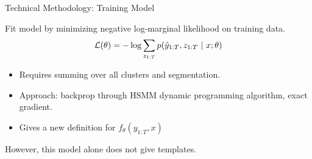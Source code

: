 \begin{frame}{Technical Methodology:  Training Model}


  Fit model by minimizing  negative log-marginal likelihood on training data.
    \[ {\cal L}(\theta) =  - \log \sum_{z_{1:T}} p(\hat{y}_{1:T}, z_{1:T} \ |\ x; \theta)\]
   
  
    \begin{itemize}
    \item Requires summing over all clusters and segmentation.
    \item Approach: backprop through HSMM dynamic programming algorithm, exact gradient.
    \item Gives a new definition for $f_\theta(y_{1:T}, x)$
    \end{itemize}
    
    However, this model alone does not give templates.
    \air
\end{frame}



